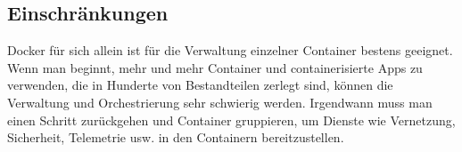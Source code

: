\subsection{Einschränkungen}

Docker für sich allein ist für die Verwaltung einzelner Container bestens geeignet. Wenn man beginnt, mehr und mehr Container und containerisierte Apps zu verwenden, 
die in Hunderte von Bestandteilen zerlegt sind, können die Verwaltung und Orchestrierung sehr schwierig werden. Irgendwann muss man einen Schritt zurückgehen und Container gruppieren, 
um Dienste wie Vernetzung, Sicherheit, Telemetrie usw. in den Containern bereitzustellen.
